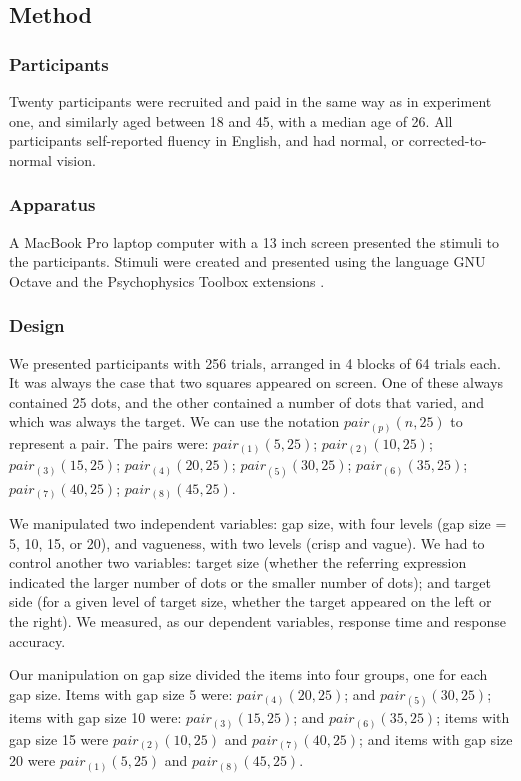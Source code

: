 \documentclass[man,floatmark]{apa}
\begin{document}
\subsection{Method}

\subsubsection{Participants}

Twenty participants were recruited and paid in the same way as in experiment one, and similarly aged between 18 and 45, with a median age of 26. All participants self-reported fluency in English, and had normal, or corrected-to-normal vision.

\subsubsection{Apparatus}

A MacBook Pro laptop computer with a 13 inch screen presented the stimuli to the participants. Stimuli were created and presented using the language GNU Octave \cite{eaton:2002} and the Psychophysics Toolbox extensions \cite{ptbx1, ptbx2}.

\subsubsection{Design}

We presented participants with 256 trials, arranged in 4 blocks of 64 trials each. It was always the case that two squares appeared on screen. One of these always contained 25 dots, and the other contained a number of dots that varied, and which was always the target. We can use the notation $pair_{(p)}(n,25)$ to represent a pair. The pairs were: $pair_{(1)}(5,25)$; $pair_{(2)}(10,25)$; $pair_{(3)}(15,25)$; $pair_{(4)}(20,25)$; $pair_{(5)}(30,25)$; $pair_{(6)}(35,25)$; $pair_{(7)}(40,25)$; $pair_{(8)}(45,25)$.

We manipulated two independent variables: gap size, with four levels (gap size = 5, 10, 15, or 20), and vagueness, with two levels (crisp and vague). We had to control another two variables: target size (whether the referring expression indicated the larger number of dots or the smaller number of dots); and target side (for a given level of target size, whether the target appeared on the left or the right). We measured, as our dependent variables, response time and response accuracy.

Our manipulation on gap size divided the items into four groups, one for each gap size. Items with gap size 5 were: $pair_{(4)}(20,25)$; and $pair_{(5)}(30,25)$; items with gap size 10 were: $pair_{(3)}(15,25)$; and $pair_{(6)}(35,25)$; items with gap size 15 were $pair_{(2)}(10,25)$ and $pair_{(7)}(40,25)$; and items with gap size 20 were $pair_{(1)}(5,25)$ and $pair_{(8)}(45,25)$.
\end{document}

